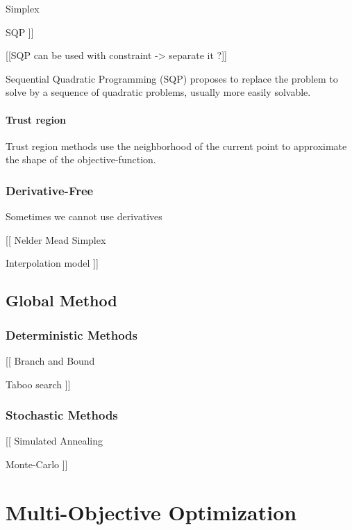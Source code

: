 Simplex

SQP
]]

[[SQP can be used with constraint -> separate it ?]]

Sequential Quadratic Programming (SQP) proposes to replace the problem to solve by a sequence of quadratic problems, usually more easily solvable.

\subsubsection{Trust region}

Trust region methods use the neighborhood of the current point to approximate the shape of the objective-function.


\subsection{Derivative-Free}

Sometimes we cannot use derivatives 

[[
Nelder Mead Simplex

Interpolation model
]]

\section{Global Method}

\subsection{Deterministic Methods}

[[
Branch and Bound

Taboo search
]]

\subsection{Stochastic Methods}

[[
Simulated Annealing

Monte-Carlo
]]

\chapter{Multi-Objective Optimization}

